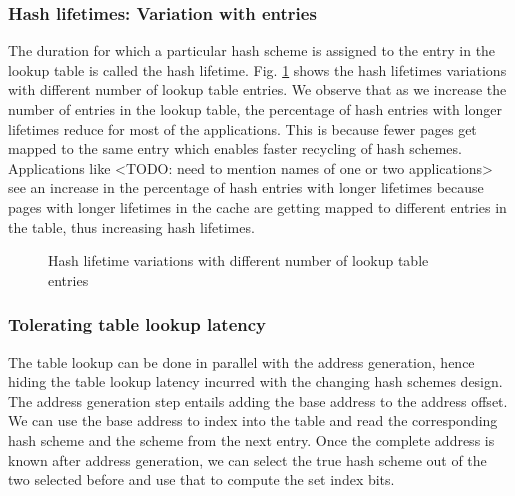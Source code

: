 \subsubsection{Hash lifetimes: Variation with entries}
The duration for which a particular hash scheme is assigned to the entry in the lookup table is called the hash lifetime. Fig. \ref{figure:Hash_lifetime} shows the hash lifetimes variations with different number of lookup table entries. We observe that as we increase the number of entries in the lookup table, the percentage of hash entries with longer lifetimes reduce for most of the applications. This is because fewer pages get mapped to the same entry which enables faster recycling of hash schemes. Applications like <TODO: need to mention names of one or two applications> see an increase in the percentage of hash entries with longer lifetimes because pages with longer lifetimes in the cache are getting mapped to different entries in the table, thus increasing hash lifetimes.
\begin{figure}
  \caption{Hash lifetime variations with different number of lookup table entries}
  \label{figure:Hash_lifetime}
\end{figure}

\subsubsection{Tolerating table lookup latency}
The table lookup can be done in parallel with the address generation, hence hiding the table lookup latency incurred with the changing hash schemes design. The address generation step entails adding the base address to the address offset. We can use the base address to index into the table and read the corresponding hash scheme and the scheme from the next entry. Once the complete address is known after address generation, we can select the true hash scheme out of the two selected before and use that to compute the set index bits. 

